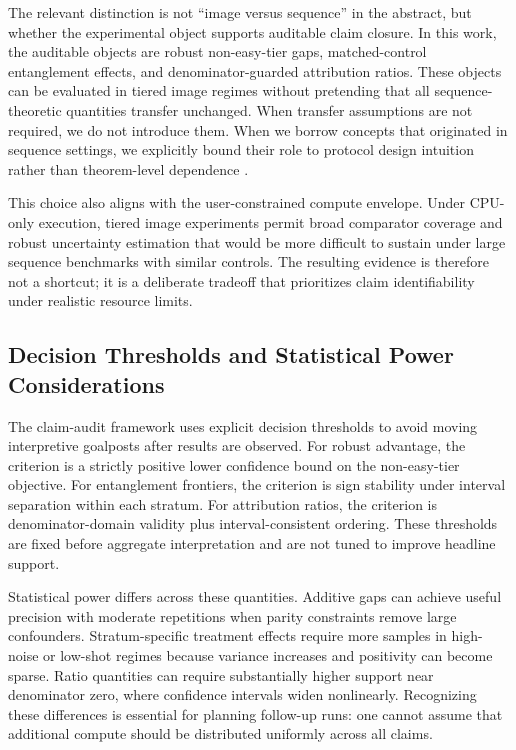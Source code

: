 \documentclass{article} %
\begin{document}
The relevant distinction is not ``image versus sequence'' in the abstract, but whether the experimental object supports auditable claim closure. In this work, the auditable objects are robust non-easy-tier gaps, matched-control entanglement effects, and denominator-guarded attribution ratios. These objects can be evaluated in tiered image regimes without pretending that all sequence-theoretic quantities transfer unchanged. When transfer assumptions are not required, we do not introduce them. When we borrow concepts that originated in sequence settings, we explicitly bound their role to protocol design intuition rather than theorem-level dependence \citep{arxiv_2603_21371,arxiv_2602_21544,arxiv_2603_17182}.

This choice also aligns with the user-constrained compute envelope. Under CPU-only execution, tiered image experiments permit broad comparator coverage and robust uncertainty estimation that would be more difficult to sustain under large sequence benchmarks with similar controls. The resulting evidence is therefore not a shortcut; it is a deliberate tradeoff that prioritizes claim identifiability under realistic resource limits.

\subsection{Decision Thresholds and Statistical Power Considerations}
The claim-audit framework uses explicit decision thresholds to avoid moving interpretive goalposts after results are observed. For robust advantage, the criterion is a strictly positive lower confidence bound on the non-easy-tier objective. For entanglement frontiers, the criterion is sign stability under interval separation within each stratum. For attribution ratios, the criterion is denominator-domain validity plus interval-consistent ordering. These thresholds are fixed before aggregate interpretation and are not tuned to improve headline support.

Statistical power differs across these quantities. Additive gaps can achieve useful precision with moderate repetitions when parity constraints remove large confounders. Stratum-specific treatment effects require more samples in high-noise or low-shot regimes because variance increases and positivity can become sparse. Ratio quantities can require substantially higher support near denominator zero, where confidence intervals widen nonlinearly. Recognizing these differences is essential for planning follow-up runs: one cannot assume that additional compute should be distributed uniformly across all claims.
\end{document}
